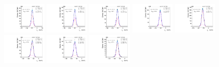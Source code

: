 \begin{figure}[htb]
\includegraphics[width=0.19\textwidth]{plots/Appendix_Recoil_Fits/WmpMC_PF_5TeV_2G/pfu1fit_24.pdf}
\includegraphics[width=0.19\textwidth]{plots/Appendix_Recoil_Fits/WmpMC_PF_5TeV_2G/pfu1fit_25.pdf}
\includegraphics[width=0.19\textwidth]{plots/Appendix_Recoil_Fits/WmpMC_PF_5TeV_2G/pfu1fit_26.pdf}
\includegraphics[width=0.19\textwidth]{plots/Appendix_Recoil_Fits/WmpMC_PF_5TeV_2G/pfu1fit_27.pdf}
\includegraphics[width=0.19\textwidth]{plots/Appendix_Recoil_Fits/WmpMC_PF_5TeV_2G/pfu1fit_28.pdf}
\includegraphics[width=0.19\textwidth]{plots/Appendix_Recoil_Fits/WmpMC_PF_5TeV_2G/pfu1fit_29.pdf}
\includegraphics[width=0.19\textwidth]{plots/Appendix_Recoil_Fits/WmpMC_PF_5TeV_2G/pfu1fit_30.pdf}
\includegraphics[width=0.19\textwidth]{plots/Appendix_Recoil_Fits/WmpMC_PF_5TeV_2G/pfu1fit_31.pdf}

\end{figure}
